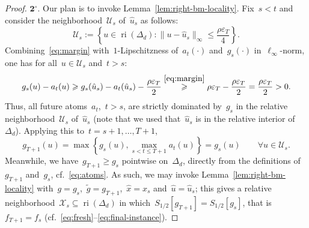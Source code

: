 \documentclass[11pt]{article}
\numberwithin{equation}{section}
\let\le\leqslant
\let\ge\geqslant
\theoremstyle{remark}
\newcommand{\proofstep}[1]{$\textbf{#1}^{\circ}$}
\newcommand{\norm}[1]{\left\lVert #1\right\rVert}
\newcommand{\veps}{\varepsilon}
\newcommand{\abs}[1]{\lvert #1\rvert}
\newcommand{\ri}{\operatorname{ri}}
\newcommand{\Env}{S}
\newcommand{\Simp}{\Delta_d}
\newcommand{\prox}{\operatorname{prox}}
\newcommand{\1}{\mathbf{1}}
\begin{document}
\begin{proof}
\noindent\proofstep{2}. %
Our plan is to invoke Lemma~\ref{lem:right-bm-locality}.
Fix~$s<t$ and consider the neighborhood~$\mathcal{U}_s$ of~$\hat u_s$ as follows:
\[
\mathcal{U}_s 
:= 
\left\{
	u \in \ri(\Simp): \|u - \hat u_s\|_{\infty} \le \frac{\rho\veps_T}{4}
\right\}.
\]
Combining~\eqref{eq:margin} with~$1$-Lipschitzness of~$a_t(\cdot)$ and~$g_s(\cdot)$ in~$\ell_\infty$-norm, one has for all~$u \in \mathcal{U}_s$ and~$t > s$:
\[
        g_s(u)-a_t(u)
        \ge
        g_s(\hat u_s)-a_t(\hat u_s)-\frac{\rho\veps_T}{2}
        \stackrel{\eqref{eq:margin}}{\ge}
        \rho\veps_T - \frac{\rho\veps_T}{2}
        =\frac{\rho\veps_T}{2}
        >0.
\]
Thus, all future atoms~$a_t$,~$t > s$, are strictly dominated by~$g_s$ in the relative neighborhood~$\mathcal{U}_s$ of~$\hat u_s$ (note that we used that~$\hat u_s$ is in the relative interior of~$\Simp$). 
Applying this to~$t = s+1, \ldots, T+1$, 
\begin{equation*}
        g_{T+1}(u)
        =\max \left\{g_s(u), \max_{s < t \le T+1} a_t(u)\right\}
        =g_s(u) 
      \qquad \forall u \in \mathcal{U}_s.
\end{equation*}
Meanwhile, we have~$g_{T+1} \ge g_s$ pointwise on~$\Simp$, directly from the definitions of~$g_{T+1}$ and~$g_s$, cf.~\eqref{eq:atoms}.
As such, we may invoke Lemma~\ref{lem:right-bm-locality} with~$g=g_s$,~$\tilde g=g_{T+1}$,~$\hat x=x_s$ and~$\hat u = \hat u_s$; 
this gives a relative neighborhood~$\mathcal{X}_s \subseteq \ri(\Simp)$ in which~$S_{1/2}[g_{T+1}] = S_{1/2}[g_s]$, that is~$f_{T+1} = f_s$ (cf.~\eqref{eq:fresh}--\eqref{eq:final-instance}).
\end{proof}
\end{document}
